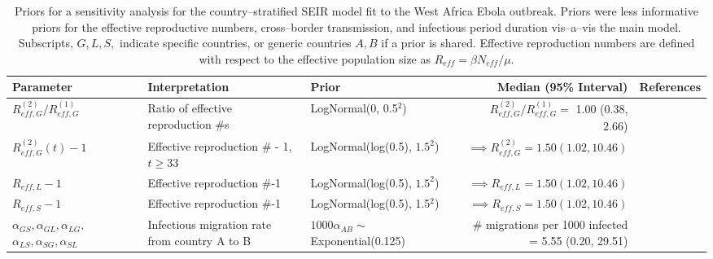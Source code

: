\begin{table}
	\begin{fullpage}
		\caption[Loose priors used in a sensitivity analysis for a stratified SEIR model for Ebola in West Africa.]{Priors for a sensitivity analysis for the country--stratified SEIR model fit to the West Africa Ebola outbreak. Priors were less informative priors for the effective reproductive numbers, cross--border transmission, and infectious period duration vis--a--vis the main model. Subscripts, $ G,L,S, $ indicate specific countries, or generic countries $ A,B $ if a prior is shared. Effective reproduction numbers are defined with respect to the effective population size as $ R_{eff} = \beta N_{eff} /\mu $.}
		\label{tab:ebola_priors_joint_diffuse}
		\scriptsize
		\centering
		\begin{tabular}{lllrr}
			\hline
			\textbf{Parameter} &  \textbf{Interpretation} & \textbf{Prior} & \textbf{Median (95\% Interval)} & \textbf{References} \\ \hline
			$ R_{eff,G}^{(2)} / R_{eff,G}^{(1)} $ & Ratio of effective reproduction \#s &  LogNormal(0, 0.5$ ^2 $) & $ R_{eff,G}^{(2)} / R_{eff,G}^{(1)} = $ 1.00 (0.38, 2.66) & \cite{chowell2014transmission,chretien2015mathematical,coltart2017ebola,king2015avoidable} \\
			$ R_{eff,G}^{(2)}(t)-1 $ & Effective reproduction \# - 1, $ t\geq33 $ & LogNormal(log(0.5), $ 1.5^2 $) & $ \implies R_{eff,G}^{(2)} = 1.50 (1.02, 10.46)$ &  \cite{chowell2014transmission,chretien2015mathematical,coltart2017ebola,king2015avoidable} \\
			$ R_{eff,L} -1 $ & Effective reproduction \#-1 &  LogNormal(log(0.5), $ 1.5^2 $) & $ \implies R_{eff,L} = 1.50 (1.02, 10.46)$ &  \cite{chowell2014transmission,chretien2015mathematical,coltart2017ebola,king2015avoidable} \\
			$ R_{eff,S}-1 $ & Effective reproduction \#-1 & LogNormal(log(0.5), 1.5$ ^2 $) & $ \implies R_{eff,S} = 1.50 (1.02, 10.46)$ &  \cite{chowell2014transmission,chretien2015mathematical,coltart2017ebola,king2015avoidable}\\
			\makecell[l]{$ \alpha_{GS},\alpha_{GL}, \alpha_{LG},$\\
				$ \alpha_{LS},\alpha_{SG}, \alpha_{SL} $} & \makecell[l]{Infectious migration rate \\ from country A to B} & $ 1000\alpha_{AB} \sim$ Exponential(0.125) & \makecell[r]{\# migrations per 1000 infected \\ = 5.55 (0.20, 29.51)} & \cite{dudas2017virus}\\ 

\end{tabular}
\end{fullpage}
\end{table}
